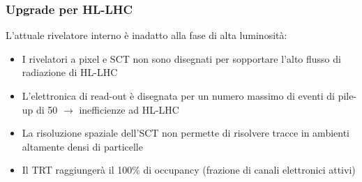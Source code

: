 \documentclass{beamer}
\begin{document}
\begin{frame}
\frametitle{Upgrade per HL-LHC}
L'attuale rivelatore interno \`e inadatto alla fase di alta luminosit\`a:
\pause
\begin{itemize}
\item<+-> I rivelatori a pixel e SCT non sono disegnati per sopportare l'alto
flusso di radiazione di HL-LHC
\item<+-> L'elettronica di read-out \`e disegnata per un numero massimo di eventi
		di pile-up di 50 $\rightarrow$ inefficienze ad HL-LHC
\item<+-> La risoluzione spaziale dell'SCT non permette di risolvere tracce
		in ambienti altamente densi di particelle
\item<+-> Il TRT raggiunger\`a il 100\% di occupancy (frazione di canali elettronici attivi)
\end{itemize}

\bigskip


\end{frame}

\end{document}
